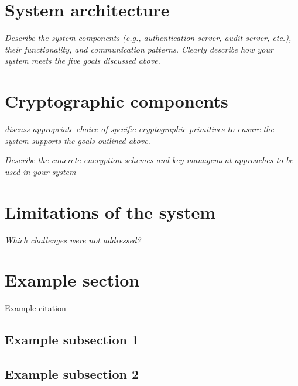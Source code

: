 \documentclass[11pt]{article}
\begin{document}
\begin{flushleft}
\section{System architecture}

\textit{Describe the system components (e.g., authentication server, audit server, etc.), their functionality, and communication patterns. Clearly describe how your system meets the five goals discussed above.}

\section{Cryptographic components}

\textit{discuss appropriate choice of specific cryptographic primitives to ensure the system supports the goals outlined above.}

\textit{Describe the concrete encryption schemes and key management approaches to be used in your system}

\section{Limitations of the system}

\textit{Which challenges were not addressed?}

\section{Example section}

Example citation \cite{neuman2009challenges}

\subsection{Example subsection 1}

\subsection{Example subsection 2}

\newpage






\end{flushleft}
	
\end{document}

